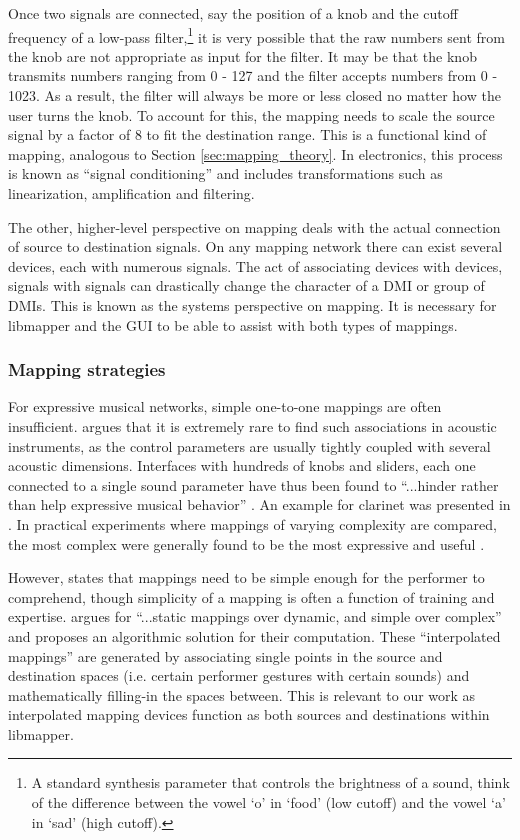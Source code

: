 Once two signals are connected, say the position of a knob and the cutoff frequency of a low-pass filter,\footnote{A standard synthesis parameter that controls the brightness of a sound, think of the difference between the vowel `o' in `food' (low cutoff) and the vowel `a' in `sad' (high cutoff).} it is very possible that the raw numbers sent from the knob are not appropriate as input for the filter. It may be that the knob transmits numbers ranging from 0 - 127 and the filter accepts numbers from 0 - 1023. As a result, the filter will always be more or less closed no matter how the user turns the knob. To account for this, the mapping needs to scale the source signal by a factor of 8 to fit the destination range. This is a functional kind of mapping, analogous to Section \ref{sec:mapping_theory}. In electronics, this process is known as ``signal conditioning'' and includes transformations such as linearization, amplification and filtering.

The other, higher-level perspective on mapping deals with the actual connection of source to destination signals. On any mapping network there can exist several devices, each with numerous signals. The act of associating devices with devices, signals with signals can drastically change the character of a DMI or group of DMIs. This is known as the systems perspective on mapping. It is necessary for libmapper and the GUI to be able to assist with both types of mappings.

	\subsubsection{Mapping strategies}

For expressive musical networks, simple one-to-one mappings are often insufficient.  argues that it is extremely rare to find such associations in acoustic instruments, as the control parameters are usually tightly coupled with several acoustic dimensions. Interfaces with hundreds of knobs and sliders, each one connected to a single sound parameter have thus been found to ``...hinder rather than help expressive musical behavior'' . An example for clarinet was presented in . In practical experiments where mappings of varying complexity are compared, the most complex were generally found to be the most expressive and useful \cite{mapping_complexity_experiments}. 

However,  states that mappings need to be simple enough for the performer to comprehend, though simplicity of a mapping is often a function of training and expertise.  argues for ``...static mappings over dynamic, and simple over complex'' and proposes an algorithmic solution for their computation. These ``interpolated mappings'' are generated by associating single points in the source and destination spaces (i.e. certain performer gestures with certain sounds) and mathematically filling-in the spaces between. This is relevant to our work as interpolated mapping devices function as both sources and destinations within libmapper.

